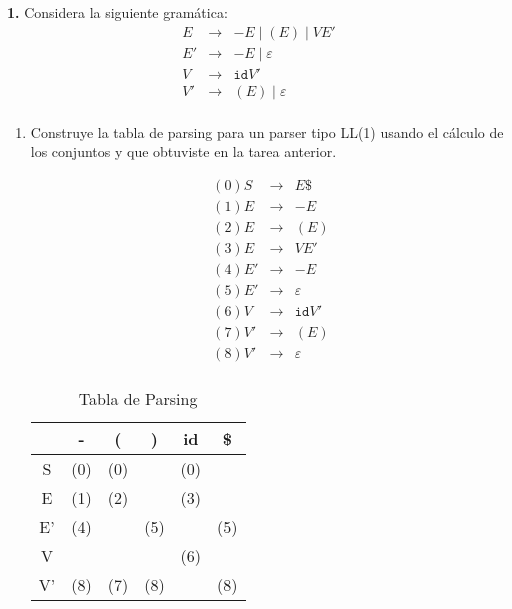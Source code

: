 \textbf{1.} Considera la siguiente gram\'atica:
\[
    \begin{array}{rcl}
        E & \to & -E \mid (E) \mid VE'\\
        E' & \to & -E \mid \varepsilon\\
        V & \to & \mathtt{id}V'\\
        V' & \to & (E) \mid \varepsilon\\
    \end{array}
\]
\begin{enumerate}

    \item Construye la tabla de parsing para un parser tipo
    LL(1) usando el c\'alculo de los conjuntos {\ffst} y {\ffollow} que obtuviste
    en la tarea anterior.

    \[
        \begin{array}{rcl}
        (0) S & \to & E\$ \\
        (1) E & \to & -E \\
        (2) E & \to & (E)\\
        (3) E & \to & VE'\\
        (4) E' & \to & -E \\
        (5) E' & \to & \varepsilon\\
        (6) V & \to & \mathtt{id}V'\\
        (7) V' & \to & (E) \\
        (8) V' & \to & \varepsilon\\
        \end{array}
    \]

        \begin{table}[h]
            \centering
            \caption{Tabla de Parsing}
            \label{tab:parsing}
            \begin{tabular}{|c|c|c|c|c|c|}

                \hline
                  & - & ( & ) & id & \$ \\
                \hline
                S & (0) & (0) & & (0) & \\
                \hline
                E & (1) & (2) &  & (3) &\\
                \hline
                E' & (4) & & (5) & & (5) \\
                \hline
                V & & & & (6) & \\
                \hline
                V' & (8) & (7) & (8) & & (8) \\
                \hline


\end{tabular}
\end{table}
\end{enumerate}
